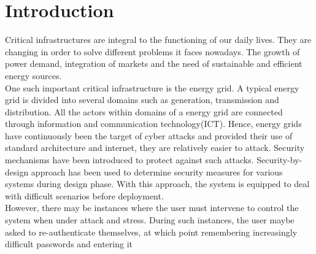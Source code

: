 \section{Introduction}

Critical infrastructures are integral to the functioning of our daily lives. They are changing in order to solve different problems it faces nowadays. The growth of power demand, integration of markets and the need of sustainable and efficient energy sources. \\
One such important critical infrastructure is the energy grid. A typical energy grid is divided into several domains such as generation, transmission and distribution. All the actors within domains of a energy grid are connected through information and communication technology(ICT). Hence, energy grids have continuously been the target of cyber attacks and provided their use of standard architecture and internet, they are relatively easier to attack. Security mechanisms have been introduced to protect against such attacks. Security-by-design approach has been used to determine security measures for various systems during design phase. With this approach, the system is equipped to deal with difficult scenarios before deployment. \\ However, there may be instances where the user must intervene to control the system when under attack and stress. During such instances, the user maybe asked to re-authenticate themselves, at which point remembering increasingly difficult passwords and entering it %

